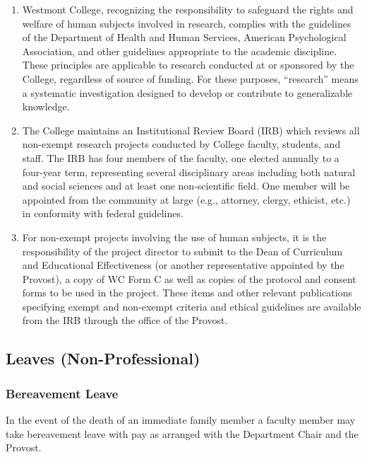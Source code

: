 			\begin{enumerate}[label=\alph*)]

				\item{ Westmont College, recognizing the responsibility to safeguard
					the rights and welfare of human subjects involved in research,
					complies with the guidelines of the Department of Health and Human
					Services, American Psychological Association, and other guidelines
					appropriate to the academic discipline.  These principles are
					applicable to research conducted at or sponsored by the College,
					regardless of source of funding.  For these purposes, ``research''
					means a systematic investigation designed to develop or contribute
					to generalizable knowledge. }

				\item{ The College maintains an Institutional Review Board (IRB)
					which reviews all non-exempt research projects conducted by College
					faculty, students, and staff.  The IRB has four members of the
					faculty, one elected annually to a four-year term, representing
					several disciplinary areas including both natural and social
					sciences and at least one non-scientific field.  One member will be
					appointed from the community at large (e.g., attorney, clergy,
					ethicist, etc.) in conformity with federal guidelines. }

				\item{ For non-exempt projects involving the use of human subjects,
					it is the responsibility of the project director to submit to the
					Dean of Curriculum and Educational Effectiveness (or another
					representative appointed by the Provost), a copy of WC Form C as
					well as copies of the protocol and consent forms to be used in the
					project.  These items and other relevant publications specifying
					exempt and non-exempt criteria and ethical guidelines are available
					from the IRB through the office of the Provost. }

			\end{enumerate}
	\subsection{Leaves (Non-Professional)}
		\subsubsection{Bereavement Leave}
			In the event of the death of an immediate family member a faculty member may take bereavement leave with pay as arranged with the Department Chair and the Provost.
